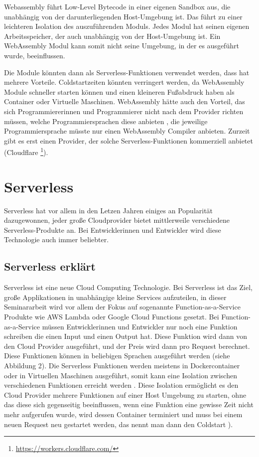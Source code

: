 Webassembly führt Low-Level Bytecode in einer eigenen Sandbox aus, die unabhängig von der darunterliegenden Host-Umgebung ist. Das führt zu einer leichteren Isolation des auszuführenden Moduls. Jedes Modul hat seinen eigenen Arbeitsspeicher, der auch unabhängig von der Host-Umgebung ist. Ein WebAssembly Modul kann somit nicht seine Umgebung, in der es ausgeführt wurde, beeinflussen. \autocite[]{Haas2017}

Die Module könnten dann als Serverless-Funktionen verwendet werden, dass hat mehrere Vorteile. Coldstartzeiten könnten verringert werden, da WebAssembly Module schneller starten können und einen kleineren Fußabdruck haben als Container oder Virtuelle Maschinen. WebAssembly hätte auch den Vorteil, das sich Programmiererinnen und Programmierer nicht nach dem Provider richten müssen, welche Programmiersprachen diese anbieten \autocite[]{Zakai2011} \autocite[]{Vilk2014} \autocite[]{LetzGRAME2017}, die jeweilige Programmiersprache müsste nur einen WebAssembly Compiler anbieten. Zurzeit gibt es erst einen Provider, der solche Serverless-Funktionen kommerziell anbietet (Cloudflare \footnote{\url{https://workers.cloudflare.com/}}).


\section{Serverless}
\label{section:Serverless}

Serverless hat vor allem in den Letzen Jahren einiges an Popularität dazugewonnen, jeder große Cloudprovider bietet mittlerweile verschiedene Serverless-Produkte an. Bei Entwicklerinnen und Entwickler wird diese Technologie auch immer beliebter.

\subsection{Serverless erklärt}

Serverless ist eine neue Cloud Computing Technologie. Bei Serverless ist das Ziel, große Applikationen in unabhängige kleine Services aufzuteilen, in dieser Seminararbeit wird vor allem der Fokus auf sogenannte Function-as-a-Service Produkte wie AWS Lambda oder Google Cloud Functions gesetzt. Bei Function-as-a-Service müssen Entwicklerinnen und Entwickler nur noch eine Funktion schreiben die einen Input und einen Output hat. Diese Funktion wird dann von den Cloud Provider ausgeführt, und der Preis wird dann pro Request berechnet. Diese Funktionen können in beliebigen Sprachen ausgeführt werden (siehe Abbildung 2). Die Serverless Funktionen werden meistens in Dockercontainer \autocite{Merkel} oder in Virtuellen Maschinen ausgeführt, somit kann eine Isolation zwischen verschiedenen Funktionen erreicht werden \autocite[]{Zakai2011}. Diese Isolation ermöglicht es den Cloud Provider mehrere Funktionen auf einer Host Umgebung zu starten, ohne das diese sich gegenseitig beeinflussen, wenn eine Funktion eine gewisse Zeit nicht mehr aufgerufen wurde, wird dessen Container terminiert und muss bei einem neuen Request neu gestartet werden, das nennt man dann den Coldstart \autocite[]{Lloyd}). \autocite[]{Muthusamy2017}


